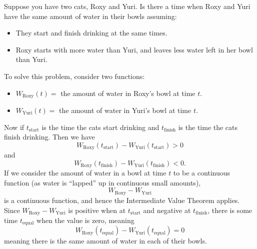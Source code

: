 \documentclass{ximera}
\begin{document}
\begin{example}
Suppose you have two cats, Roxy and Yuri. Is there a time when Roxy
and Yuri have the same amount of water in their bowls assuming:
  \begin{itemize}
  \item They start and finish drinking at the same times.
  \item Roxy starts with more water than Yuri, and leaves less water
    left in her bowl than Yuri.
  \end{itemize}

\begin{explanation} 
  To solve this problem, consider two functions:
  \begin{itemize}
    \item $W_{\mathrm{Roxy}}(t) =$ the amount of water in Roxy's bowl at time $t$.
    \item $W_{\mathrm{Yuri}}(t) =$ the amount of water in Yuri's bowl at time $t$.
  \end{itemize}
  Now if $t_\mathrm{start}$ is the time the cats start drinking and
  $t_\mathrm{finish}$ is the time the cats finish drinking. Then we have
  \[
  W_\mathrm{Roxy}(t_\mathrm{start})-W_{\mathrm{Yuri}}(t_\mathrm{start}) > 0%
  \]
  and
  \[
  W_\mathrm{Roxy}(t_\mathrm{finish})-W_{\mathrm{Yuri}}(t_\mathrm{finish}) < 0.
  \]
  If we consider the amount of water in a bowl at time $t$ to be a continuous
  function (as water is ``lapped'' up in continuous small amounts),
  \[
  W_\mathrm{Roxy}-W_{\mathrm{Yuri}}
  \]
  is a continuous function, and hence the Intermediate Value Theorem
  applies. Since $W_\mathrm{Roxy}-W_{\mathrm{Yuri}}$ is positive when
  at $t_\mathrm{start}$ and negative at $t_\mathrm{finish}$, there is
  some time $t_\mathrm{equal}$ when the value is zero, meaning
  \[
  W_\mathrm{Roxy}(t_\mathrm{equal})-  W_{\mathrm{Yuri}}(t_\mathrm{equal}) =0
  \]
  meaning there is the same amount of water in each of their bowls.
\end{explanation}
\end{example}


\end{document}
